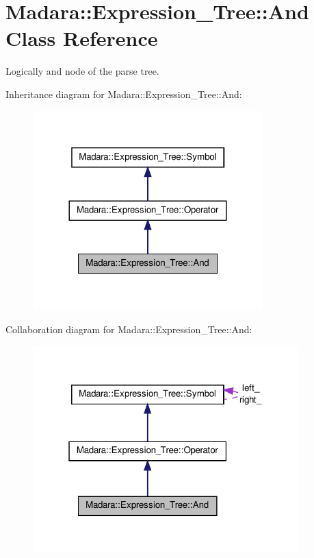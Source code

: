 \hypertarget{classMadara_1_1Expression__Tree_1_1And}{
\section{Madara::Expression\_\-Tree::And Class Reference}
\label{d4/d37/classMadara_1_1Expression__Tree_1_1And}
}


Logically and node of the parse tree.  




Inheritance diagram for Madara::Expression\_\-Tree::And:
\nopagebreak
\begin{figure}[H]
\begin{center}
\leavevmode
\includegraphics[width=252pt]{d0/d72/classMadara_1_1Expression__Tree_1_1And__inherit__graph}
\end{center}
\end{figure}


Collaboration diagram for Madara::Expression\_\-Tree::And:
\nopagebreak
\begin{figure}[H]
\begin{center}
\leavevmode
\includegraphics[width=292pt]{db/d03/classMadara_1_1Expression__Tree_1_1And__coll__graph}
\end{center}
\end{figure}
